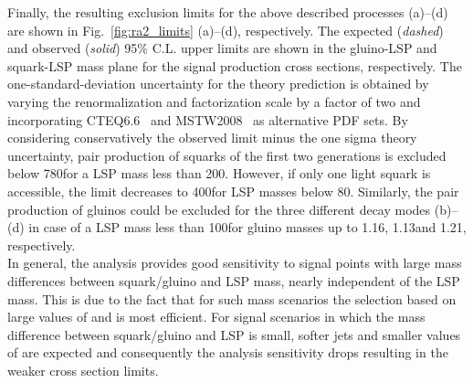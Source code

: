 Finally, the resulting exclusion limits for the above described processes (a)--(d) are shown in Fig.~\ref{fig:ra2_limits} (a)--(d), respectively. The expected (\textit{dashed}) and observed (\textit{solid}) 95\% C.L. upper limits are shown in the gluino-LSP and squark-LSP mass plane for the signal production cross sections, respectively. The one-standard-deviation uncertainty for the theory prediction is obtained by varying the renormalization and factorization scale by a factor of two and incorporating CTEQ6.6~\cite{Nadolsky:2008zw} and MSTW2008~\cite{Martin:2009iq} as alternative PDF sets. By considering conservatively the observed limit minus the one sigma theory uncertainty, pair production of squarks of the first two generations is excluded below 780\gev for a LSP mass less than 200\gev. However, if only one light squark is accessible, the limit decreases to 400\gev for LSP masses below 80\gev. Similarly, the pair production of gluinos could be excluded for the three different decay modes (b)--(d) in case of a LSP mass less than 100\gev for gluino masses up to 1.16\tev, 1.13\tev and 1.21\tev, respectively. \\
In general, the analysis provides good sensitivity to signal points with large mass differences between squark/gluino and LSP mass, nearly independent of the LSP mass. This is due to the fact that for such mass scenarios the selection based on large values of \HT and \MHT is most efficient. For signal scenarios in which the mass difference between squark/gluino and LSP is small, softer jets and smaller values of \MHT are expected and consequently the analysis sensitivity drops resulting in the weaker cross section limits.

